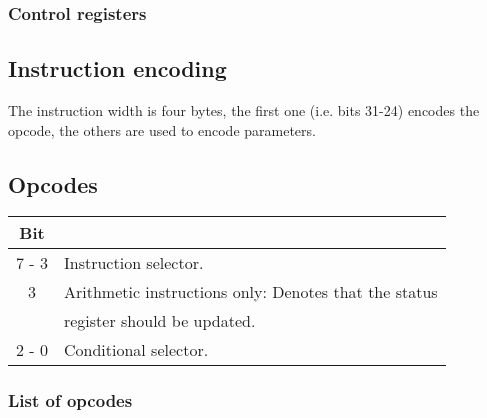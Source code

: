 \documentclass{article}
\begin{document}
\subsubsection{Control registers}

\subsection{Instruction encoding}

The instruction width is four bytes, the first one (i.e. bits 31-24)
encodes the opcode, the others are used to encode parameters.

\subsection{Opcodes}

\begin{center}
  \begin{tabular}{c|l}
    Bit & \\
    \hline
    7 - 3  & Instruction selector. \\
    3      & Arithmetic instructions only: Denotes that the status \\
           & register should be updated. \\
    2 - 0  & Conditional selector. \\
  \end{tabular}
\end{center}

\subsubsection{List of opcodes}


\end{document}
